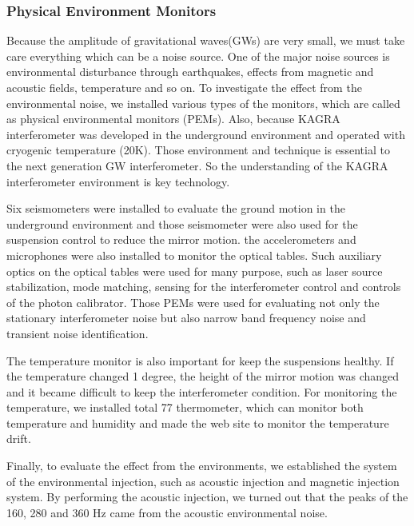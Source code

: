 \vspace{10pt}
\subsubsection*{\bf Physical Environment Monitors}
\vspace{3pt}

\vspace{3pt}

\vspace{3pt}

Because the amplitude of gravitational waves(GWs) are very small, 
we must take care everything which can be a noise source.
One of the major noise sources is environmental disturbance through earthquakes, 
effects from magnetic and acoustic fields, temperature and so on.
To investigate the effect from the environmental noise, 
we installed various types of the monitors, which are called as
physical environmental monitors (PEMs).
Also, because KAGRA interferometer was developed in the underground environment and 
operated with cryogenic temperature (20K).
Those environment and technique is essential to the next generation
GW interferometer. 
So the understanding of the KAGRA interferometer environment is  key technology.

Six seismometers were installed to evaluate the ground motion in the
underground environment and those seismometer were also used for the suspension 
control to reduce the mirror motion.
the accelerometers and microphones were also installed to monitor the optical tables.
Such auxiliary optics on the optical tables were used for many purpose, such as 
laser source stabilization, mode matching, sensing for the interferometer control and 
controls of the photon calibrator.
Those PEMs were used for evaluating not only the stationary interferometer noise but also
narrow band frequency noise and transient noise identification.

The temperature monitor is also important for keep the suspensions healthy.
If the temperature changed 1 degree, the height of the mirror motion was changed and 
it became difficult to keep the interferometer condition.
For monitoring the temperature, we installed total 77 thermometer, which can monitor both
temperature and humidity and made the web site to monitor the temperature drift.

Finally, to evaluate the effect from the environments, we established the system of the 
environmental injection, such as acoustic injection and magnetic injection system.
By performing the acoustic injection, we turned out that the peaks of the 160, 280 and 
360 Hz came from the acoustic environmental noise.
